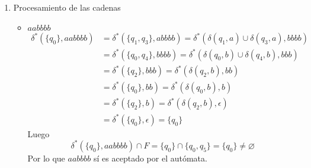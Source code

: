 \documentclass{article}
\begin{document}
\begin{enumerate}
{\begin{itemize}
\begin{enumerate}
{\begin{center}
\begin{figure}[H]
                			\caption{$M$ que reconoce a $L$}
                		\end{figure}
                		\end{center}
                	}
                	\item{
                	 Procesamiento de las cadenas
                	\begin{itemize}
                		\item {
                			$aabbbb$
                			\begin{align*}
                			\delta^{*}(\{q_{0}\}, aabbbb) 
                			&= \delta^{*}(\{q_{1}, q_{3}\}, abbbb) 
                			= \delta^{*}(\delta(q_{1}, a) 
                			\cup \delta(q_{3}, a), bbbb) \\
                			&= \delta^{*}(\{q_{0}, q_{4}\}, bbbb) 
                			= \delta^{*}(\delta(q_{0}, b) 
                			\cup \delta(q_{4}, b), bbb) \\
                			&= \delta^{*}(\{q_{2}\}, bbb) 
                			= \delta^{*}(\delta(q_{2}, b), bb) \\
                			&= \delta^{*}(\{q_{0}\}, bb) 
                			= \delta^{*}(\delta(q_{0}, b), b) \\
                			&= \delta^{*}(\{q_{2}\}, b) 
                			= \delta^{*}(\delta(q_{2}, b), \epsilon) \\
                			&= \delta^{*}(\{q_{0}\}, \epsilon) 
                			=  \{q_{0}\}
                			\end{align*}
                			Luego 
                			\[\delta^{*}(\{q_{0}\}, aabbbb) \cap F = 
                			\{q_{0}\} \cap \{q_{0}, q_{5}\}
                			= \{q_{0}\} \neq \varnothing\]
                			Por lo que $aabbbb$ sí es aceptado por el 
                			autómata.
                		}
                		
                		$  $\\
                		

\end{itemize}}
\end{enumerate}
\end{itemize}}
\end{enumerate}
\end{document}
